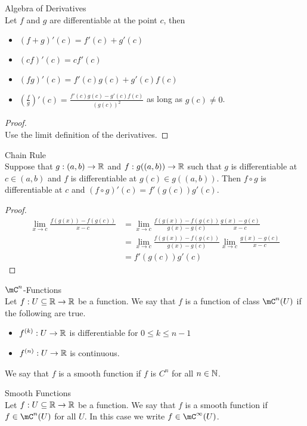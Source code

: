 \documentclass[a4paper]{article}
\begin{document}
\begin{thm}{Algebra of Derivatives}{}\\ Let $f$ and $g$ are differentiable at the point $c$, then
\begin{itemize}
\item $(f+g)'(c)=f'(c)+g'(c)$
\item $(cf)'(c)=cf'(c)$
\item $(fg)'(c)=f'(c)g(c)+g'(c)f(c)$
\item $\left(\frac{f}{g}\right)'(c)=\frac{f'(c)g(c)-g'(c)f(c)}{\left(g(c)\right)^2}$ as long as $g(c)\neq 0$. 
\end{itemize}
\begin{proof}\\ Use the limit definition of the derivatives. 
\end{proof}
\end{thm}

\begin{thm}{Chain Rule}{}\\ Suppose that $g:(a,b)\to\mathbb{R}$ and $f:g((a,b))\to\mathbb{R}$ such that $g$ is differentiable at $c\in(a,b)$ and $f$ is differentiable at $g(c)\in g((a,b))$. Then $f\circ g$ is differentiable at $c$ and $(f\circ g)'(c)=f'(g(c))g'(c)$. 
\begin{proof}\\
\begin{align*}
\lim_{x\to c}\frac{f(g(x))-f(g(c))}{x-c}&=\lim_{x\to c}\frac{f(g(x))-f(g(c))}{g(x)-g(c)}\frac{g(x)-g(c)}{x-c}\\
&=\lim_{x\to c}\frac{f(g(x))-f(g(c))}{g(x)-g(c)}\lim_{x\to c}\frac{g(x)-g(c)}{x-c}\\
&=f'(g(c))g'(c)
\end{align*}
\end{proof}
\end{thm}

\begin{defn}{$\mC^n$-Functions}{}\\ Let $f:U\subseteq\mathbb{R}\to\mathbb{R}$ be a function. We say that $f$ is a function of class $\mC^n(U)$ if the following are true. 
\begin{itemize}
\item $f^{(k)}:U\to\mathbb{R}$ is differentiable for $0\leq k\leq n-1$
\item $f^{(n)}:U\to\mathbb{R}$ is continuous. 
\end{itemize}
We say that $f$ is a smooth function if $f$ is $C^n$ for all $n\in\mathbb{N}$. 
\end{defn}

\begin{defn}{Smooth Functions}{}\\ Let $f:U\subseteq\mathbb{R}\to\mathbb{R}$ be a function. We say that $f$ is a smooth function if $f\in\mC^n(U)$ for all $U$. In this case we write $f\in\mC^\infty(U)$. 
\end{defn}
\end{document}
